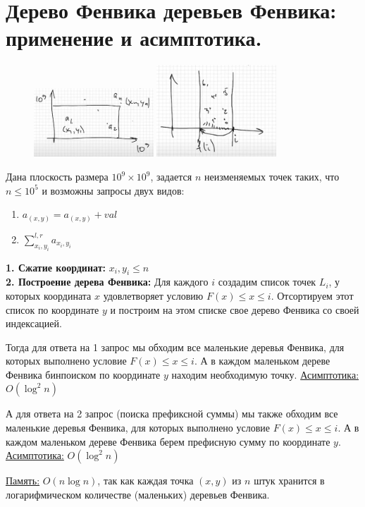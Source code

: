 \section{Дерево Фенвика деревьев Фенвика: применение и асимптотика. }
\begin{figure}
\vspace{-2ex}
\centering
\includegraphics[width=0.4\textwidth]{images/70-75_ff2}
\includegraphics[width=0.4\textwidth]{images/70-75_ff1}
\end{figure}
Дана плоскость размера $10^9\times 10^9$, задается $n$ неизменяемых точек таких, что $n\leq 10^5$ и возможны запросы двух видов:
\begin{enumerate}
    \item $a_{(x,y)}= a_{(x,y)} + val$
    \item $\sum_{x_i,y_i}^{l,r}a_{x_i,y_i}$
\end{enumerate}
\textbf{1. Сжатие координат:} \quad  $x_i,y_i \leq n$
\\ \newline \textbf{2. Построение дерева Фенвика:}
\newline Для каждого $i$ создадим список точек $L_i$, у которых координата $x$ удовлетворяет условию $F(x)\leq x \leq i$. Отсортируем этот список по координате $y$ и построим на этом списке свое дерево Фенвика со своей индексацией.
\\ \par \noindent Тогда для ответа на 1 запрос мы обходим все маленькие деревья Фенвика, для которых выполнено условие $F(x)\leq x \leq i$. А в каждом маленьком дереве Фенвика бинпоиском по координате $y$ находим необходимую точку. \underline{Асимптотика:} $O(\log ^2 n)$
\\ \par \noindent А для ответа на 2 запрос (поиска префиксной суммы) мы также обходим все маленькие деревья Фенвика, для которых выполнено условие $F(x)\leq x \leq i$. А в каждом маленьком дереве Фенвика берем префисную сумму по координате $y$. \underline{Асимптотика:} $O(\log ^2 n)$
\\ \par \noindent \underline{Память:} $O(n\log n)$, так как каждая точка $(x,y)$ из $n$ штук хранится в логарифмическом количестве (маленьких) деревьев Фенвика.